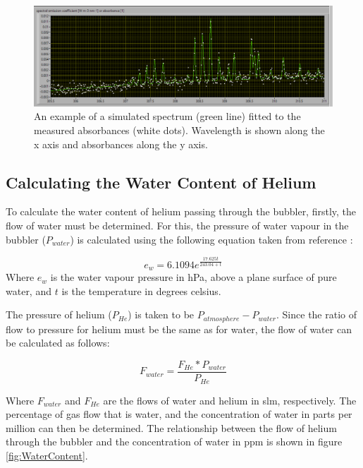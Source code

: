 \documentclass[11pt, oneside]{article}   	%
\begin{document}
\begin{figure}
    \centering
    \includegraphics[width=\textwidth]{Figures/SpectrumFitting.png}
    \caption{An example of a simulated spectrum (green line) fitted to the measured absorbances (white dots). Wavelength is shown along the x axis and absorbances along the y axis.}
    \label{fig:SpectrumFitting}
\end{figure}

\subsection{Calculating the Water Content of Helium}
\label{subsec:CalculatingWaterContent}


To calculate the water content of helium passing through the bubbler, firstly, the flow of water must be determined. For this, the pressure of water vapour in the bubbler ($P_{water}$) is calculated using the following equation taken from reference \cite{Alduchov1996}:

\begin{equation}
	e_w = 6.1094 e^{\frac{17.625t}{243.04 + t}}
\end{equation}
Where $e_w$ is the water vapour pressure in hPa, above a plane surface of pure water, and $t$ is the temperature in degrees celsius.

The pressure of helium ($P_{He}$) is taken to be $P_{atmosphere} - P_{water}$. Since the ratio of flow to pressure for helium must be the same as for water, the flow of water can be calculated as follows:

\begin{equation}
    F_{water} = \frac{F_{He} * P_{water}}{P_{He}}
\end{equation}

Where $F_{water}$ and $F_{He}$ are the flows of water and helium in slm, respectively. The percentage of gas flow that is water, and the concentration of water in parts per million can then be determined.
The relationship between the flow of helium through the bubbler and the concentration of water in ppm is shown in figure \ref{fig:WaterContent}.
\end{document}
